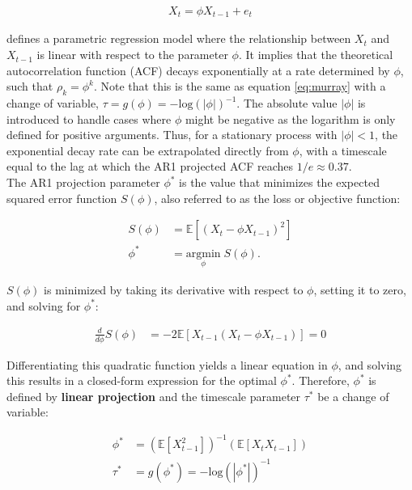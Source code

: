 \documentclass[main.tex]{subfiles}
\begin{document}
\begin{align}\label{eq:ar1}
    X_t = \phi X_{t-1} + e_t
\end{align}

\noindent defines a parametric regression model where the relationship between $X_t$ and $X_{t-1}$ is linear with respect to the parameter $\phi$. It implies that the theoretical autocorrelation function (ACF) decays exponentially at a rate determined by $\phi$, such that $\rho_k = \phi^k$. Note that this is the same as equation \eqref{eq:murray} with a change of variable, $\tau = g(\phi) = -{\text{log}(|\phi|)}^{-1}$. The absolute value $|\phi|$ is introduced to handle cases where $\phi$ might be negative as the logarithm is only defined for positive arguments. Thus, for a stationary process with $|\phi|<1$, the exponential decay rate can be extrapolated directly from $\phi$, with a timescale equal to the lag at which the AR1 projected ACF reaches $1/e \approx 0.37$. \\

The AR1 projection parameter $\phi^*$ is the value that minimizes the expected squared error function $S(\phi)$, also referred to as the loss or objective function:

\begin{align}
    S(\phi) &= \mathbb{E}[(X_t - \phi X_{t-1})^2]\\
    \phi^* &= \underset{\phi}{\text{argmin}} \; S(\phi).
\end{align}

\noindent $S(\phi)$ is minimized by taking its derivative with respect to $\phi$, setting it to zero, and solving for $\phi^*$:

\begin{align}
    \frac{d}{d\phi} S(\phi) &= -2 \mathbb{E}[X_{t-1}(X_t - \phi X_{t-1})] = 0
\end{align}

\noindent Differentiating this quadratic function yields a linear equation in $\phi$, and solving this results in a closed-form expression for the optimal $\phi^*$. Therefore, $\phi^*$ is defined by \textbf{linear projection} and the timescale parameter $\tau^*$ be a change of variable:

\begin{align}
    \phi^* &= (\mathbb{E}[X_{t-1}^2])^{-1}(\mathbb{E}[X_t X_{t-1}]) \label{eq:ar1-phi}\\
    \tau^* &= g(\phi^*) = -{\text{log}(|\phi^*|)}^{-1} \label{eq:ar1-tau}
\end{align}
\\
\end{document}
